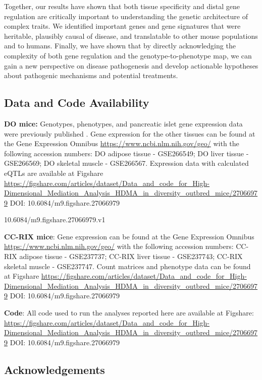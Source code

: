 \documentclass[
]{article}
\begin{document}
Together, our results have shown that both tissue specificity and distal
gene regulation are critically important to understanding the genetic
architecture of complex traits. We identified important genes and gene
signatures that were heritable, plausibly causal of disease, and
translatable to other mouse populations and to humans. Finally, we have
shown that by directly acknowledging the complexity of both gene
regulation and the genotype-to-phenotype map, we can gain a new
perspective on disease pathogenesis and develop actionable hypotheses
about pathogenic mechanisms and potential treatments.

\subsection{Data and Code
Availability}\label{data-and-code-availability}

\textbf{DO mice:} Genotypes, phenotypes, and pancreatic islet gene
expression data were previously published \cite{pmid29567659}. Gene
expression for the other tissues can be found at the Gene Expression
Omnibus \url{https://www.ncbi.nlm.nih.gov/geo/} with the following
accession numbers: DO adipose tissue - GSE266549; DO liver tissue -
GSE266569; DO skeletal muscle - GSE266567. Expression data with
calculated eQTLs are available at Figshare
\url{https://figshare.com/articles/dataset/Data_and_code_for_High-Dimensional_Mediation_Analysis_HDMA_in_diversity_outbred_mice/27066979}
DOI: 10.6084/m9.figshare.27066979

10.6084/m9.figshare.27066979.v1

\textbf{CC-RIX mice}: Gene expression can be found at the Gene
Expression Omnibus \url{https://www.ncbi.nlm.nih.gov/geo/} with the
following accession numbers: CC-RIX adipose tissue - GSE237737; CC-RIX
liver tissue - GSE237743; CC-RIX skeletal muscle - GSE237747. Count
matrices and phenotype data can be found at Figshare
\url{https://figshare.com/articles/dataset/Data_and_code_for_High-Dimensional_Mediation_Analysis_HDMA_in_diversity_outbred_mice/27066979}
DOI: 10.6084/m9.figshare.27066979

\textbf{Code}: All code used to run the analyses reported here are
available at Figshare:
\url{https://figshare.com/articles/dataset/Data_and_code_for_High-Dimensional_Mediation_Analysis_HDMA_in_diversity_outbred_mice/27066979}
DOI: 10.6084/m9.figshare.27066979

\subsection{Acknowledgements}\label{acknowledgements}
\end{document}
